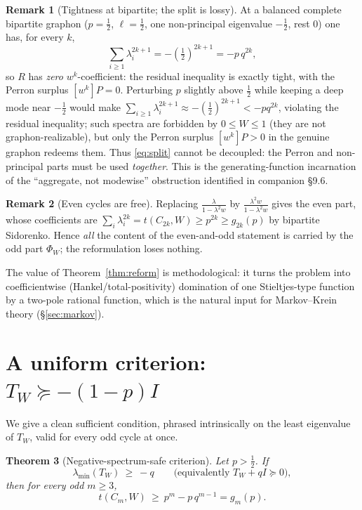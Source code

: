 \documentclass[11pt]{article}
\newtheorem{theorem}{Theorem}[section]
\theoremstyle{definition}
\newtheorem{remark}[theorem]{Remark}
\newcommand{\1}{\mathbf{1}}
\begin{document}
\begin{remark}[Tightness at bipartite; the split is lossy]\label{rem:tight}
At a balanced complete bipartite graphon ($p=\tfrac12$, $\ell=\tfrac12$, one
non-principal eigenvalue $-\tfrac12$, rest $0$) one has, for every $k$,
\[
\sum_{i\ge1}\lambda_i^{2k+1}=-(\tfrac12)^{2k+1}=-p\,q^{2k},
\]
so $R$ has \emph{zero} $w^k$-coefficient: the residual inequality is exactly
tight, with the Perron surplus $[w^k]P=0$. Perturbing $p$ slightly above
$\tfrac12$ while keeping a deep mode near $-\tfrac12$ would make
$\sum_{i\ge1}\lambda_i^{2k+1}\approx-(\tfrac12)^{2k+1}<-pq^{2k}$, violating the
residual inequality; such spectra are forbidden by $0\le W\le1$ (they are not
graphon-realizable), but only the Perron surplus $[w^k]P>0$ in the genuine
graphon redeems them. Thus \eqref{eq:split} cannot be decoupled: the Perron and
non-principal parts must be used \emph{together}. This is the
generating-function incarnation of the ``aggregate, not modewise'' obstruction
identified in companion \S9.6.
\end{remark}

\begin{remark}[Even cycles are free]\label{rem:even}
Replacing $\frac{\lambda}{1-\lambda^2w}$ by $\frac{\lambda^2 w}{1-\lambda^2 w}$
gives the even part, whose coefficients are $\sum_i\lambda_i^{2k}=t(C_{2k},W)\ge
p^{2k}\ge g_{2k}(p)$ by bipartite Sidorenko. Hence \emph{all} the content of the
even-and-odd statement is carried by the odd part $\Phi_W$; the reformulation
loses nothing.
\end{remark}

The value of Theorem~\ref{thm:reform} is methodological: it turns the problem
into coefficientwise (Hankel/total-positivity) domination of one Stieltjes-type
function by a two-pole rational function, which is the natural input for
Markov--Krein theory (\S\ref{sec:markov}).

\section{A uniform criterion: \texorpdfstring{$T_W\succeq-(1-p)I$}{TW >= -(1-p)I}}
\label{sec:negsafe}

We give a clean sufficient condition, phrased intrinsically on the least
eigenvalue of $T_W$, valid for every odd cycle at once.

\begin{theorem}[Negative-spectrum-safe criterion]\label{thm:negsafe}
Let $p>\tfrac12$. If
\[
\lambda_{\min}(T_W)\ \ge\ -q\qquad\text{(equivalently }T_W+qI\succeq0\text{)},
\]
then for every odd $m\ge3$,
\[
t(C_m,W)\ \ge\ p^m-p\,q^{m-1}=g_m(p).
\]
\end{theorem}
\end{document}
